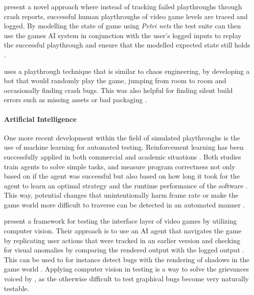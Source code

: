 \documentclass{article}
\begin{document}
    \textcite{becares2017approach} present a novel approach where instead of tracking failed playthroughs through crash reports, successful human play\-throughs of video game levels are traced and logged. By modelling the state of game using \emph{Petri nets} the test suite can then use the games AI system in conjunction with the user's logged inputs to replay the successful playthrough and ensure that the modelled expected state still holds \parencite{becares2017approach}.

    \textcite{gilbert2018unit} uses a playthrough technique that is similar to chaos engineering, by developing a bot that would randomly play the game, jumping from room to room and occasionally finding crash bugs. This was also helpful for finding silent build errors such as missing assets or bad packaging \parencite{gilbert2018unit}.

    \paragraph{Artificial Intelligence}
    One more recent development within the field of simulated playthroughs is the use of machine learning for automated testing. Reinforcement learning has been successfully applied in both commercial and academic situations \parencite{bedder2019ai,loubos2018automated}. Both studies train agents to solve simple tasks, and measure program correctness not only based on if the agent was successful but also based on how long it took for the agent to learn an optimal strategy and the runtime performance of the software \parencite{bedder2019ai,loubos2018automated}. This way, potential changes that unintentionally harm frame rate or make the game world more difficult to traverse can be detected in an automated manner \parencite{bedder2019ai}.

    \textcite{nantes2008framework} present a framework for testing the interface layer of video games by utilizing computer vision. Their approach is to use an AI agent that navigates the game by replicating user actions that were tracked in an earlier version and checking for visual anomalies by comparing the rendered output with the logged output \parencite{nantes2008framework}. This can be used to for instance detect bugs with the rendering of shadows in the game world \parencite{nantes2008framework}. Applying computer vision in testing is a way to solve the grievances voiced by \textcite{gilbert2018unit}, as the otherwise difficult to test graphical bugs become very naturally testable.
\end{document}
